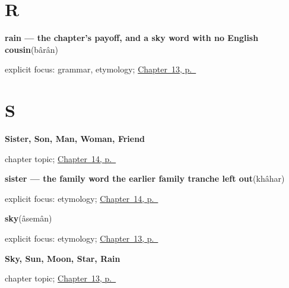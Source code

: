 \section*{R}

\noindent\begin{minipage}[t]{\linewidth}
\raggedright
\textbf{rain — the chapter's payoff, and a sky word with no English cousin}\enspace\emph{}\enspace(bârân)\par
\footnotesize explicit focus: grammar, etymology; \hyperref[ch:fa-sky-words]{Chapter~13, p.~\pageref*{ch:fa-sky-words}}
\end{minipage}\par\smallskip

\section*{S}

\noindent\begin{minipage}[t]{\linewidth}
\raggedright
\textbf{Sister, Son, Man, Woman, Friend}\par
\footnotesize chapter topic; \hyperref[ch:fa-people-words]{Chapter~14, p.~\pageref*{ch:fa-people-words}}
\end{minipage}\par\smallskip

\noindent\begin{minipage}[t]{\linewidth}
\raggedright
\textbf{sister — the family word the earlier family tranche left out}\enspace\emph{}\enspace(khâhar)\par
\footnotesize explicit focus: etymology; \hyperref[ch:fa-people-words]{Chapter~14, p.~\pageref*{ch:fa-people-words}}
\end{minipage}\par\smallskip

\noindent\begin{minipage}[t]{\linewidth}
\raggedright
\textbf{sky}\enspace\emph{}\enspace(âsemân)\par
\footnotesize explicit focus: etymology; \hyperref[ch:fa-sky-words]{Chapter~13, p.~\pageref*{ch:fa-sky-words}}
\end{minipage}\par\smallskip

\noindent\begin{minipage}[t]{\linewidth}
\raggedright
\textbf{Sky, Sun, Moon, Star, Rain}\par
\footnotesize chapter topic; \hyperref[ch:fa-sky-words]{Chapter~13, p.~\pageref*{ch:fa-sky-words}}
\end{minipage}\par\smallskip

